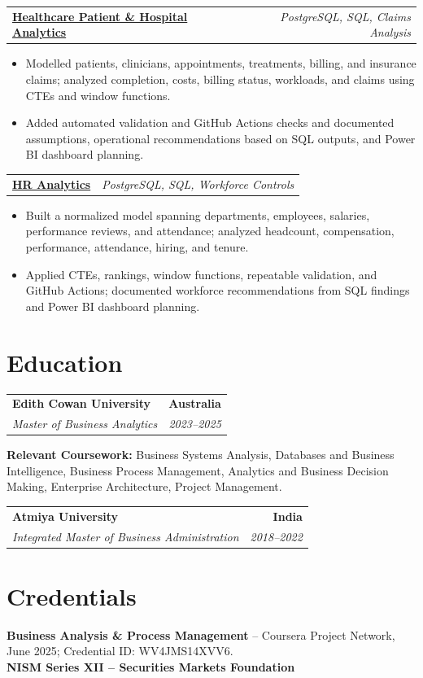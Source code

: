\documentclass[letterpaper,10pt]{article}
\makeatletter
\newcommand{\role}[4]{%
  \begin{tabularx}{\textwidth}{@{}Xr@{}}
    \textbf{#1} & \textbf{#2} \\
    \textit{#3} & \textit{#4}
  \end{tabularx}\vspace{-1pt}
}
\newcommand{\project}[2]{%
  \begin{tabularx}{\textwidth}{@{}Xr@{}}
    \textbf{#1} & \textit{#2}
  \end{tabularx}\vspace{-1pt}
}
\makeatother
\begin{document}
\project{\href{https://github.com/jainalimehta/Healthcare-Analytics}{Healthcare Patient \& Hospital Analytics}}{PostgreSQL, SQL, Claims Analysis}
\begin{itemize}
  \item Modelled patients, clinicians, appointments, treatments, billing, and insurance claims; analyzed completion, costs, billing status, workloads, and claims using CTEs and window functions.
  \item Added automated validation and GitHub Actions checks and documented assumptions, operational recommendations based on SQL outputs, and Power BI dashboard planning.
\end{itemize}
\vspace{1pt}

\project{\href{https://github.com/jainalimehta/HR-Analytics}{HR Analytics}}{PostgreSQL, SQL, Workforce Controls}
\begin{itemize}
  \item Built a normalized model spanning departments, employees, salaries, performance reviews, and attendance; analyzed headcount, compensation, performance, attendance, hiring, and tenure.
  \item Applied CTEs, rankings, window functions, repeatable validation, and GitHub Actions; documented workforce recommendations from SQL findings and Power BI dashboard planning.
\end{itemize}

\section{Education}
\role{Edith Cowan University}{Australia}{Master of Business Analytics}{2023--2025}
\small\textbf{Relevant Coursework:} Business Systems Analysis, Databases and Business Intelligence, Business Process Management, Analytics and Business Decision Making, Enterprise Architecture, Project Management.\\[2pt]
\role{Atmiya University}{India}{Integrated Master of Business Administration}{2018--2022}

\section{Credentials}
\small\textbf{Business Analysis \& Process Management} -- Coursera Project Network, June 2025; Credential ID: WV4JMS14XVV6.\\[-0.2pt]
\small\textbf{NISM Series XII -- Securities Markets Foundation}
\end{document}
